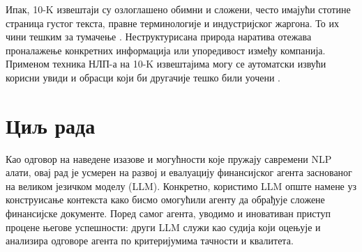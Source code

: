 Ипак, 10-K извештаји су озлоглашено обимни и сложени, често имајући стотине страница густог текста, правне терминологије и индустријског жаргона. То их чини тешким за тумачење \cite{yang_evaluating_2025}. Неструктурисана природа наратива отежава проналажење конкретних информација или упоредивост између компанија. Применом техника НЛП-а на 10-K извештајима могу се аутоматски извући корисни увиди и обрасци који би другачије тешко били уочени \cite{yang_evaluating_2025}.

\section{Циљ рада}
Као одговор на наведене изазове и могућности које пружају савремени NLP алати, овај рад је усмерен на развој и евалуацију финансијског агента заснованог на великом језичком моделу (LLM). Конкретно, користимо LLM опште намене уз конструисање контекста како бисмо омогућили агенту да обрађује сложене финансијске документе. Поред самог агента, уводимо и иновативан приступ процене његове успешности: други LLM служи као судија који оцењује и анализира одговоре агента по критеријумима тачности и квалитета. 